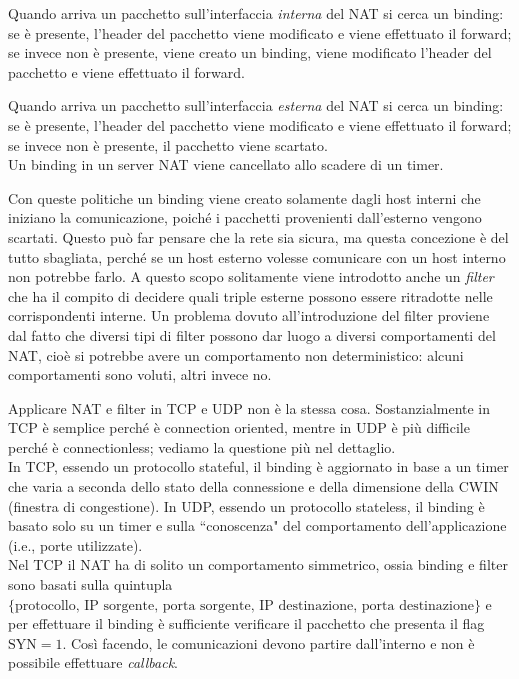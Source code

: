 Quando arriva un pacchetto sull'interfaccia \textit{interna} del NAT si cerca un binding: se è presente, l'header del pacchetto viene modificato e viene effettuato il forward; se invece non è presente, viene creato un binding, viene modificato l'header del pacchetto e viene effettuato il forward.

Quando arriva un pacchetto sull'interfaccia \textit{esterna} del NAT si cerca un binding: se è presente, l'header del pacchetto viene modificato e viene effettuato il forward; se invece non è presente, il pacchetto viene scartato.\\
Un binding in un server NAT viene cancellato allo scadere di un timer.

Con queste politiche un binding viene creato solamente dagli host interni che iniziano la comunicazione, poiché i pacchetti provenienti dall'esterno vengono scartati. Questo può far pensare che la rete sia sicura, ma questa concezione è del tutto sbagliata, perché se un host esterno volesse comunicare con un host interno non potrebbe farlo. A questo scopo solitamente viene introdotto anche un \textit{filter} che ha il compito di decidere quali triple esterne possono essere ritradotte nelle corrispondenti interne. Un problema dovuto all'introduzione del filter proviene dal fatto che diversi tipi di filter possono dar luogo a diversi comportamenti del NAT, cioè si potrebbe avere un comportamento non deterministico: alcuni comportamenti sono voluti, altri invece no.

Applicare NAT e filter in TCP e UDP non è la stessa cosa. Sostanzialmente in TCP è semplice perché è connection oriented, mentre in UDP è più difficile perché è connectionless; vediamo la questione più nel dettaglio.\\
In TCP, essendo un protocollo stateful, il binding è aggiornato in base a un timer che varia a seconda dello stato della connessione e della dimensione della CWIN (finestra di congestione). In UDP, essendo un protocollo stateless, il binding è basato solo su un timer e sulla \textquotedblleft conoscenza" del comportamento dell'applicazione (i.e., porte utilizzate).\\
Nel TCP il NAT ha di solito un comportamento simmetrico, ossia binding e filter sono basati sulla quintupla $\{\text{protocollo, IP sorgente, porta sorgente, IP destinazione, porta destinazione}\}$ e per effettuare il binding è sufficiente verificare il pacchetto che presenta il flag $\text{SYN} = 1$. Così facendo, le comunicazioni devono partire dall'interno e non è possibile effettuare \textit{callback}.

